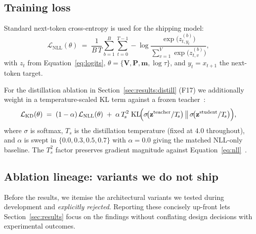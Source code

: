 \documentclass[runningheads]{llncs}
\newcommand{\bV}{\mathbf{V}}
\newcommand{\bP}{\mathbf{P}}
\newcommand{\bm}{\mathbf{m}}
\newcommand{\bz}{\mathbf{z}}
\begin{document}
\subsection{Training loss}
\label{sec:method:loss}

Standard next-token cross-entropy is used for the shipping model:
\begin{equation}
\mathcal{L}_{\mathrm{NLL}}(\theta)
\;=\;
\frac{1}{B\,T}\sum_{b=1}^{B}\sum_{t=0}^{T-1}
  -\log \frac{\exp\bigl(z_{t,y_t}^{(b)}\bigr)}
             {\sum_{v=1}^{V}\exp\bigl(z_{t,v}^{(b)}\bigr)},
\label{eq:nll}
\end{equation}
with $z_t$ from Equation~\ref{eq:logits}, $\theta = \{\bV,\bP,\bm,\log\tau\}$,
and $y_t = x_{t+1}$ the next-token target.

For the distillation ablation in Section~\ref{sec:results:distill}
(F17) we additionally weight in a temperature-scaled KL term against a
frozen teacher~\cite{hinton2015distilling}:
\begin{equation}
\mathcal{L}_{\mathrm{KD}}(\theta)
\;=\;
(1-\alpha)\,\mathcal{L}_{\mathrm{NLL}}(\theta)
\;+\;
\alpha\,T_{\!s}^{2}\;\mathrm{KL}\!\Bigl(
   \sigma\!\bigl(\bz^{\text{teacher}}/T_{\!s}\bigr)
   \,\big\|\,
   \sigma\!\bigl(\bz^{\text{student}}/T_{\!s}\bigr)
\Bigr),
\label{eq:kd}
\end{equation}
where $\sigma$ is softmax, $T_{\!s}$ is the distillation temperature
(fixed at $4.0$ throughout), and $\alpha$ is swept in
$\{0.0, 0.3, 0.5, 0.7\}$ with $\alpha=0.0$ giving the matched NLL-only
baseline. The $T_{\!s}^{2}$ factor preserves gradient magnitude
against Equation~\ref{eq:nll}~\cite{hinton2015distilling}.

\subsection{Ablation lineage: variants we do not ship}
\label{sec:method:lineage}

Before the results, we itemise the architectural variants we tested
during development and \emph{explicitly rejected}. Reporting these
concisely up-front lets Section~\ref{sec:results} focus on the
findings without conflating design decisions with experimental
outcomes.
\end{document}
